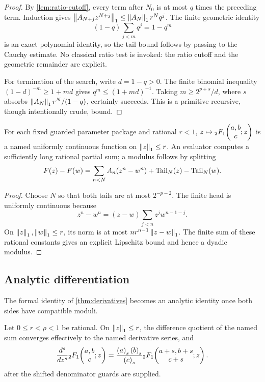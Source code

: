 \begin{proof}
By \cref{lem:ratio-cutoff}, every term after \(N_0\) is at most \(q\) times
the preceding term.  Induction gives
\(\left\lVert A_{N+j}z^{N+j}\right\rVert_1\le\left\lVert A_N\right\rVert_1r^Nq^j\).
The finite geometric identity
\[
 (1-q)\sum_{j<m}q^j=1-q^m
\]
is an exact polynomial identity, so the tail bound follows by passing to the
Cauchy estimate.  No classical ratio test is invoked: the ratio cutoff and
the geometric remainder are explicit.

For termination of the search, write \(d=1-q>0\).  The finite binomial
inequality
\((1-d)^{-m}\ge1+md\) gives
\(q^m\le(1+md)^{-1}\).  Taking
\(m\ge2^{p+s}/d\), where \(s\) absorbs
\(\left\lVert A_N\right\rVert_1r^N/(1-q)\), certainly succeeds.  This is a primitive recursive,
though intentionally crude, bound.
\end{proof}

\begin{corollary}
For each fixed guarded parameter package and rational \(r<1\),
\(z\mapsto{}_2F_1\!\left(\begin{matrix}a,b\\c\end{matrix};z\right)\) is a named uniformly continuous function on
\(\left\lVert z\right\rVert_1\le r\).  An evaluator computes a sufficiently long rational
partial sum; a modulus follows by splitting
\[
 F(z)-F(w)=\sum_{n<N}A_n(z^n-w^n)+\operatorname{Tail}_N(z)-\operatorname{Tail}_N(w).
\]
\end{corollary}

\begin{proof}
Choose \(N\) so that both tails are at most \(2^{-p-2}\).  The finite head is
uniformly continuous because
\[
 z^n-w^n=(z-w)\sum_{j<n}z^jw^{n-1-j}.
\]
On \(\left\lVert z\right\rVert_1,\left\lVert w\right\rVert_1\le r\), its norm is at most
\(n r^{n-1}\left\lVert z-w\right\rVert_1\).  The finite sum of these rational constants gives an
explicit Lipschitz bound and hence a dyadic modulus.
\end{proof}

\subsection{Analytic differentiation}

The formal identity of \cref{thm:derivatives} becomes an analytic identity
once both sides have compatible moduli.

\begin{theorem}\label{thm:analytic-derivative}
Let \(0\le r<\rho<1\) be rational.  On \(\left\lVert z\right\rVert_1\le r\), the difference
quotient of the named sum converges effectively to the named derivative
series, and
\[
 \frac{d^s}{dz^s}{}_2F_1\!\left(\begin{matrix}a,b\\c\end{matrix};z\right)
 =\frac{\left(a\right)_{s}\left(b\right)_{s}}{\left(c\right)_{s}}
   {}_2F_1\!\left(\begin{matrix}a+s,b+s\\c+s\end{matrix};z\right).
\]
after the shifted denominator guards are supplied.
\end{theorem}

